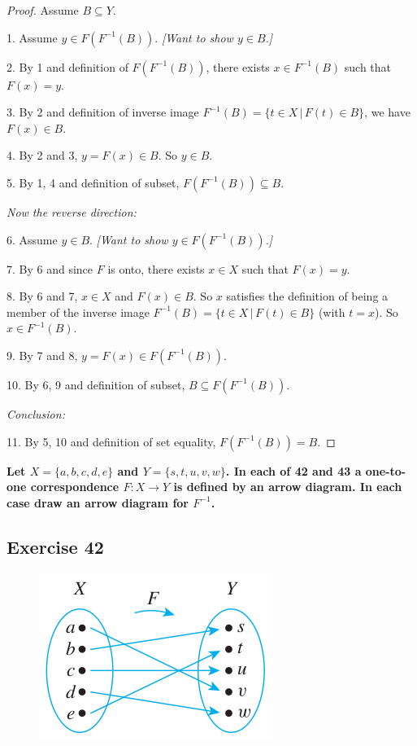 \documentclass[14pt]{extarticle}
\newcommand{\cy}{\color{cyan}}
\begin{document}
\begin{proof}
Assume \(B \subseteq Y\).

1. Assume \(y \in F(F^{-1}(B))\). {\it [Want to show \(y \in B\).]}

2. By 1 and definition of \(F(F^{-1}(B))\), there exists \(x \in F^{-1}(B)\) such that \(F(x) = y\).

3. By 2 and definition of inverse image \(F^{-1}(B) = \{t \in X \, | \, F(t) \in B\}\), we have \(F(x) \in B\).

4. By 2 and 3, \(y = F(x) \in B\). So \(y \in B\).

5. By 1, 4 and definition of subset, \(F(F^{-1}(B)) \subseteq B\).

{\it Now the reverse direction:}

6. Assume \(y \in B\). {\it [Want to show \(y \in F(F^{-1}(B))\).]}

7. By 6 and since $F$ is onto, there exists \(x \in X\) such that \(F(x) = y\).

8. By 6 and 7, \(x \in X\) and \(F(x) \in B\). So $x$ satisfies the definition of being a member of the inverse
image \(F^{-1}(B) = \{t \in X \, | \, F(t) \in B\}\) (with $t = x$). So \(x \in F^{-1}(B)\).

9. By 7 and 8, \(y = F(x) \in F(F^{-1}(B))\).

10. By 6, 9 and definition of subset, \(B \subseteq F(F^{-1}(B))\).

{\it Conclusion:}

11. By 5, 10 and definition of set equality, \(F(F^{-1}(B)) = B\).
\end{proof}

{\bf \cy Let \(X = \{a, b, c, d, e\}\) and \(Y = \{s, t, u, v, w\}\). In each of 42 and 43 a one-to-one correspondence 
\(F: X \to Y\) is defined by an arrow diagram. In each case draw an arrow diagram for \(F^{-1}\).}

\subsection{Exercise 42}
\begin{figure}[ht!]
\centering
\includegraphics[scale=0.8]{../images/7.2.42.png}
\end{figure}
\end{document}
